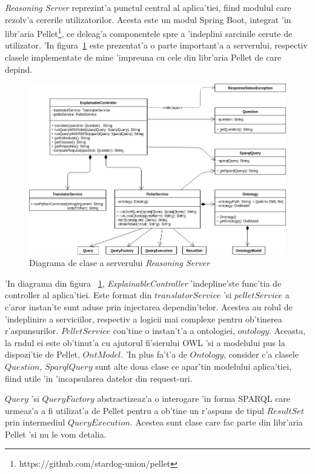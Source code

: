 \documentclass[12pt,a4paper,twoside]{report}
\begin{document}
{\it Reasoning Server} reprezint'a punctul central al aplica'tiei, fiind modulul care rezolv'a cererile utilizatorilor. Acesta este un modul Spring Boot, integrat 'in libr'aria Pellet\footnote{https://github.com/stardog-union/pellet}, ce deleag'a componentele spre a 'indeplini sarcinile cerute de utilizator. 'In figura~\ref{fig:uml_server} este prezentat'a o parte important'a a serverului, respectiv clasele implementate de mine 'impreuna cu cele din libr'aria Pellet de care depind.
\begin{figure}[h!]
    \centering
    \includegraphics[width = 0.9\linewidth]{img/uml_server.png}
        \caption{Diagrama de clase a serverului {\it Reasoning Server}}
    \label{fig:uml_server}
\end{figure}

'In diagrama din figura ~\ref{fig:uml_server}, {\it ExplainableController} 'indepline'ste func'tia de controller al aplica'tiei. Este format din $translatorService$ 'si $pelletService$ a c'aror instan'te sunt aduse prin injectarea dependin'telor. Acestea au rolul de 'indeplinire a serviciilor, respectiv a logicii mai complexe pentru ob'tinerea r'aspunsurilor. $PelletService$ con'tine o instan't'a a ontologiei, $ontology$. Aceasta, la r\ia ndul ei este ob'tinut'a cu ajutorul fi'sierului OWL 'si a modelului pus la dispozi'tie de Pellet, $OntModel$. 'In plus fa't'a de $Ontology$, consider c'a clasele $Question$, $SparqlQuery$ sunt alte doua clase ce apar'tin modelului aplica'tiei, fiind utile 'in 'incapsularea datelor din request-uri.

$Query$ 'si $QueryFactory$ abstractizeaz'a o interogare 'in forma SPARQL care urmeaz'a a fi utilizat'a de Pellet pentru a ob'tine un r'aspuns de tipul $ResultSet$ prin intermediul $QueryExecution$. Acestea sunt clase care fac parte din libr'aria Pellet 'si nu le vom detalia.
\end{document}
